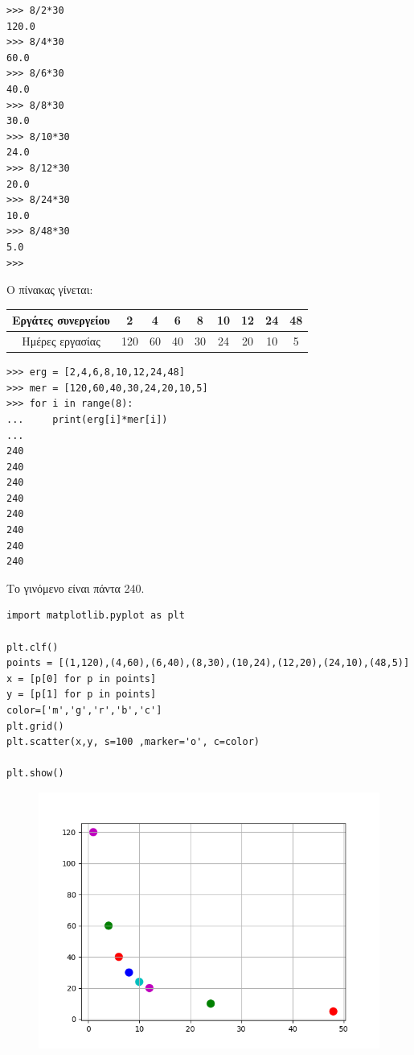\begin{lstlisting}
>>> 8/2*30
120.0
>>> 8/4*30
60.0
>>> 8/6*30
40.0
>>> 8/8*30
30.0
>>> 8/10*30
24.0
>>> 8/12*30
20.0
>>> 8/24*30
10.0
>>> 8/48*30
5.0
>>>
\end{lstlisting}
Ο πίνακας γίνεται:
	\begin{table}
	\begin{tabular}{|c|c|c|c|c|c|c|c|c|}\hline
	Εργάτες συνεργείου &2    & 4 & 6& 8& 10& 12& 24& 48\\\hline
	Ημέρες εργασίας       &120 &60& 40   & 30 &24 & 20&10 &5 \\\hline
	\end{tabular}
	\end{table}

\begin{lstlisting}
>>> erg = [2,4,6,8,10,12,24,48]
>>> mer = [120,60,40,30,24,20,10,5]
>>> for i in range(8):
...     print(erg[i]*mer[i])
...
240
240
240
240
240
240
240
240
\end{lstlisting}
Το γινόμενο είναι πάντα 240.
\begin{lstlisting}
import matplotlib.pyplot as plt

plt.clf()
points = [(1,120),(4,60),(6,40),(8,30),(10,24),(12,20),(24,10),(48,5)]
x = [p[0] for p in points]
y = [p[1] for p in points]
color=['m','g','r','b','c']
plt.grid()
plt.scatter(x,y, s=100 ,marker='o', c=color)

plt.show()
\end{lstlisting}
\begin{figure}
\includegraphics{graph5.png}
\end{figure}
